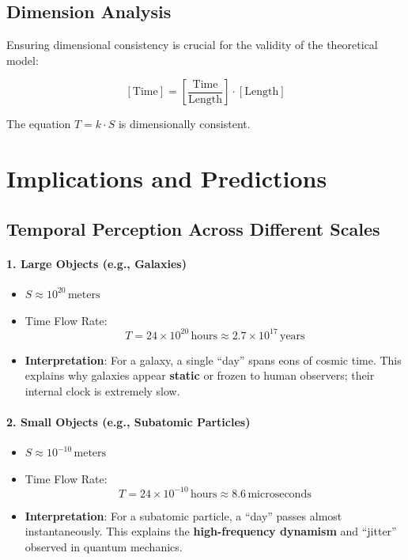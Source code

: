 \documentclass[12pt]{article}
\begin{document}
\subsection{Dimension Analysis}

Ensuring dimensional consistency is crucial for the validity of the theoretical model:

\[
[\text{Time}] = \left[\frac{\text{Time}}{\text{Length}}\right] \cdot [\text{Length}]
\]

The equation \( T = k \cdot S \) is dimensionally consistent.

\section{Implications and Predictions}

\subsection{Temporal Perception Across Different Scales}

\paragraph{1. Large Objects (e.g., Galaxies)}
\begin{itemize}
    \item \( S \approx 10^{20} \, \text{meters} \)
    \item Time Flow Rate:
\[
T = 24 \times 10^{20} \, \text{hours} \approx 2.7 \times 10^{17} \, \text{years}
\]
    \item \textbf{Interpretation}: For a galaxy, a single ``day'' spans eons of cosmic time. This explains why galaxies appear \textbf{static} or frozen to human observers; their internal clock is extremely slow.
\end{itemize}

\paragraph{2. Small Objects (e.g., Subatomic Particles)}
\begin{itemize}
    \item \( S \approx 10^{-10} \, \text{meters} \)
    \item Time Flow Rate:
\[
T = 24 \times 10^{-10} \, \text{hours} \approx 8.6 \, \text{microseconds}
\]
    \item \textbf{Interpretation}: For a subatomic particle, a ``day'' passes almost instantaneously. This explains the \textbf{high-frequency dynamism} and ``jitter'' observed in quantum mechanics.
\end{itemize}
\end{document}
